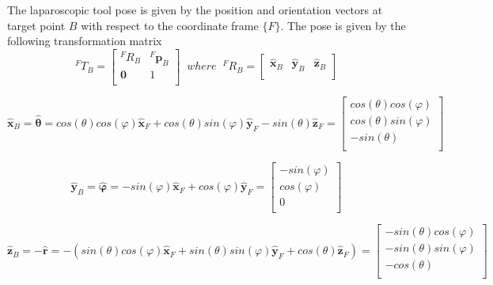 The laparoscopic tool pose is given by the position and orientation vectors at target point $B$ with respect to the coordinate frame $\lbrace F \rbrace$.
The pose is given by the following transformation matrix
\[
{}^{F}T_B = \begin{bmatrix}
{}^{F}R_B & {}^{F}\mathbf{p}^{}_B \\
\mathbf{0} & 1 \\
\end{bmatrix}
\;\; where \;\;
{}^{F}R_B = \begin{bmatrix}
\hat{\mathbf{x}}^{}_B & \hat{\mathbf{y}}^{}_B & \hat{\mathbf{z}}^{}_B \\
\end{bmatrix}
\]

\begin{equation}
\hat{\mathbf{x}}^{}_B = \hat{\mathbf{θ}} = cos(θ)cos(φ)\hat{\mathbf{x}}^{}_F + cos(θ)sin(φ)\hat{\mathbf{y}}^{}_F - sin(θ)\hat{\mathbf{z}}^{}_F
= \begin{bmatrix}
cos(θ)cos(φ) \\
cos(θ)sin(φ) \\
- sin(θ) \\
\end{bmatrix}
\end{equation}

\begin{equation}
\hat{\mathbf{y}}^{}_B = \hat{\mathbf{φ}} = -sin(φ)\hat{\mathbf{x}}^{}_F + cos(φ)\hat{\mathbf{y}}^{}_F
= \begin{bmatrix}
-sin(φ) \\
cos(φ) \\
0 \\
\end{bmatrix}
\end{equation}

\begin{equation}
\hat{\mathbf{z}}^{}_B = - \hat{\mathbf{r}} = - (sin(θ)cos(φ)\hat{\mathbf{x}}^{}_F + sin(θ)sin(φ)\hat{\mathbf{y}}^{}_F + cos(θ)\hat{\mathbf{z}}^{}_F)
= \begin{bmatrix}
-sin(θ)cos(φ) \\
-sin(θ)sin(φ) \\
-cos(θ) \\
\end{bmatrix}
\end{equation}


